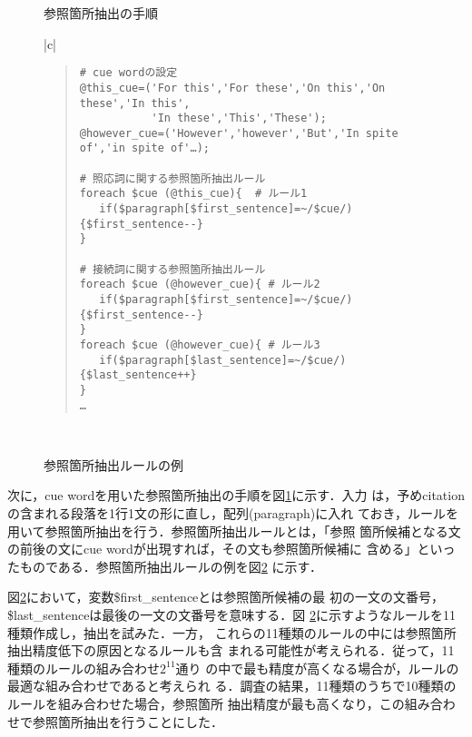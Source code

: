 \begin{figure}[t]
\vspace{-0.8cm}
\centering
{}
\caption{参照箇所抽出の手順\label{fig:ext_ra}}
\end{figure}

{\small
\begin{figure}[t]
\centering
\begin{tabular}{|c|}\hline
\begin{minipage}[c]{13.5cm}
\vspace{0.5cm}
\begin{quote}
\begin{verbatim}
# cue wordの設定
@this_cue=('For this','For these','On this','On these','In this',
           'In these','This','These');
@however_cue=('However','however','But','In spite of','in spite of'…);

# 照応詞に関する参照箇所抽出ルール
foreach $cue (@this_cue){  # ルール1
   if($paragraph[$first_sentence]=~/$cue/){$first_sentence--}
}

# 接続詞に関する参照箇所抽出ルール
foreach $cue (@however_cue){ # ルール2
   if($paragraph[$first_sentence]=~/$cue/){$first_sentence--}
}
foreach $cue (@however_cue){ # ルール3
   if($paragraph[$last_sentence]=~/$cue/){$last_sentence++}
}
…
\end{verbatim}
\end{quote}  
\vspace{0.5cm}
\end{minipage}
 \\ \hline
\end{tabular}
\caption{参照箇所抽出ルールの例\label{fig:ext_rule}}
\end{figure}
}

次に，cue wordを用いた参照箇所抽出の手順を図\ref{fig:ext_ra}に示す．入力
は，予めcitationの含まれる段落を1行1文の形に直し，配列(paragraph)に入れ
ておき，ルールを用いて参照箇所抽出を行う．参照箇所抽出ルールとは，「参照
箇所候補となる文の前後の文にcue wordが出現すれば，その文も参照箇所候補に
含める」といったものである．参照箇所抽出ルールの例を図\ref{fig:ext_rule}
に示す．

図\ref{fig:ext_rule}において，変数\$first\_sentenceとは参照箇所候補の最
初の一文の文番号，\$last\_sentenceは最後の一文の文番号を意味する．図
\ref{fig:ext_rule}に示すようなルールを11種類作成し，抽出を試みた．一方，
これらの11種類のルールの中には参照箇所抽出精度低下の原因となるルールも含
まれる可能性が考えられる．従って，11種類のルールの組み合わせ$2^{11}$通り
の中で最も精度が高くなる場合が，ルールの最適な組み合わせであると考えられ
る．調査の結果，11種類のうちで10種類のルールを組み合わせた場合，参照箇所
抽出精度が最も高くなり，この組み合わせで参照箇所抽出を行うことにした．

